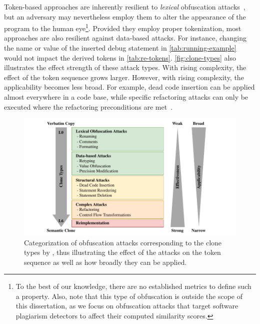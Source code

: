 Token-based approaches are inherently resilient to \textit{lexical} obfuscation attacks~\cite{Joy1999}, but an adversary may nevertheless employ them to alter the appearance of the program to the human eye\footnote{To the best of our knowledge, there are no established metrics to define such a property. Also, note that this type of obfuscation is outside the scope of this dissertation, as we focus on obfuscation attacks that target software plagiarism detectors to affect their computed similarity scores.}.
Provided they employ proper tokenization, most approaches are also resilient against data-based attacks.
For instance, changing the name or value of the inserted debug statement in \autoref{tab:running-example} would not impact the derived tokens in \autoref{tab:re-tokens}.
\autoref{fig:clone-types} also illustrates the effect strength of these attack types. With rising complexity, the effect of the token sequence grows larger.
However, with rising complexity, the applicability becomes less broad. For example, dead code insertion can be applied almost everywhere in a code base, while specific refactoring attacks can only be executed where the refactoring preconditions are met~\cite{Saglam2024b}.

        \begin{figure}
            \centering
            \includegraphics[width=\linewidth]{figures/threatmodel/Classification.pdf}
            \caption[Categorization of Obfuscation Attack Types]{Categorization of obfuscation attacks corresponding to the clone types by \citet{Karnalim2016, Faidhi1987}, thus illustrating the effect of the attacks on the token sequence as well as how broadly they can be applied.}
            \label{fig:clone-types}
        \end{figure}

